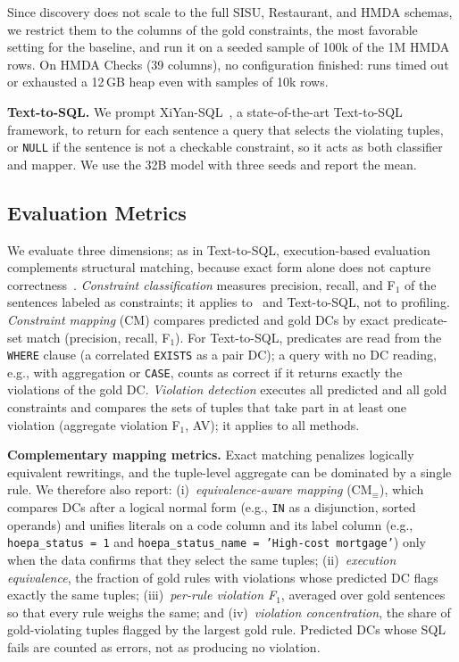 Since discovery does not scale to the full SISU, Restaurant, and HMDA schemas, we restrict them to the columns of the gold constraints, the most favorable setting for the baseline, and run it on a seeded sample of 100k of the 1M HMDA rows. On HMDA Checks (39 columns), no configuration finished: runs timed out or exhausted a 12\,GB heap even with samples of 10k rows.


\smallskip\noindent\textbf{Text-to-SQL.}
We prompt XiYan-SQL~\cite{XiYanSQL}, a state-of-the-art Text-to-SQL framework, to return for each sentence a query that selects the violating tuples, or \texttt{NULL} if the sentence is not a checkable constraint, so it acts as both classifier and mapper. We use the 32B model with three seeds and report the mean.


\subsection{Evaluation Metrics}
\label{sec:metrics}

We evaluate three dimensions; as in Text-to-SQL, execution-based evaluation complements structural matching, because exact form alone does not capture correctness~\cite{zhong-etal-2020-semantic}.
\emph{Constraint classification} measures precision, recall, and F$_1$ of the sentences labeled as constraints; it applies to \system\ and Text-to-SQL, not to profiling.
\emph{Constraint mapping} (CM) compares predicted and gold DCs by exact predicate-set match (precision, recall, F$_1$). For Text-to-SQL, predicates are read from the \texttt{WHERE} clause (a correlated \texttt{EXISTS} as a pair DC); a query with no DC reading, e.g., with aggregation or \texttt{CASE}, counts as correct if it returns exactly the violations of the gold DC.
\emph{Violation detection} executes all predicted and all gold constraints and compares the sets of tuples that take part in at least one violation (aggregate violation F$_1$, AV); it applies to all methods.

\smallskip\noindent\textbf{Complementary mapping metrics.}
Exact matching penalizes logically equivalent rewritings, and the tuple-level aggregate can be dominated by a single rule. We therefore also report:
(i)~\emph{equivalence-aware mapping} (CM$_{\equiv}$), which compares DCs after a logical normal form (e.g., \texttt{IN} as a disjunction, sorted operands) and unifies literals on a code column and its label column (e.g., \texttt{hoepa\_status = 1} and \texttt{hoepa\_status\_name = 'High-cost mortgage'}) only when the data confirms that they select the same tuples;
(ii)~\emph{execution equivalence}, the fraction of gold rules with violations whose predicted DC flags exactly the same tuples;
(iii)~\emph{per-rule violation F$_1$}, averaged over gold sentences so that every rule weighs the same; and
(iv)~\emph{violation concentration}, the share of gold-violating tuples flagged by the largest gold rule. Predicted DCs whose SQL fails are counted as errors, not as producing no violation.

